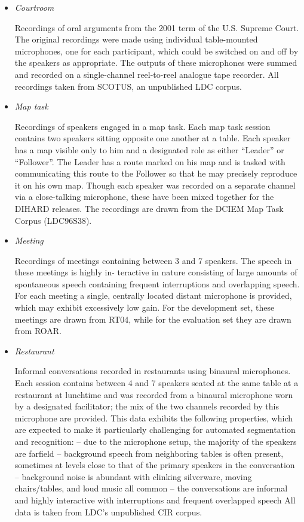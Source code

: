\begin{itemize}
	\item \emph{Courtroom}
	
	Recordings of oral arguments from the 2001 term of the U.S. Supreme Court. The original recordings were made using individual table-mounted microphones, one for each participant, which could be switched on and off by the speakers as appropriate. The outputs of these microphones were summed and recorded on a single-channel reel-to-reel analogue tape recorder. All recordings taken from SCOTUS, an unpublished LDC corpus.
	
	\item \emph{Map task}
	
	Recordings of speakers engaged in a map task. Each map task session contains two speakers sitting opposite one another at a table. Each speaker has a map visible only to him and a designated role as either “Leader” or “Follower”. The Leader has a route marked on his map and is tasked with communicating this route to the Follower so that he may precisely reproduce it on his own map. Though each speaker was recorded on a separate channel via a close-talking microphone, these have been mixed together for the DIHARD releases. The recordings are drawn from the DCIEM Map Task Corpus (LDC96S38).
	
	\item \emph{Meeting}
	
	Recordings of meetings containing between 3 and 7 speakers. The speech in these meetings is highly in- teractive in nature consisting of large amounts of spontaneous speech containing frequent interruptions and overlapping speech. For each meeting a single, centrally located distant microphone is provided, which may exhibit excessively low gain. For the development set, these meetings are drawn from RT04, while for the evaluation set they are drawn from ROAR.
	
	\item \emph{Restaurant}
	
	Informal conversations recorded in restaurants using binaural microphones. Each session contains between 4 and 7 speakers seated at the same table at a restaurant at lunchtime and was recorded from a binaural microphone worn by a designated facilitator; the mix of the two channels recorded by this microphone are provided. This data exhibits the following properties, which are expected to make it particularly challenging for automated segmentation and recognition:
	– due to the microphone setup, the majority of the speakers are farfield
	– background speech from neighboring tables is often present, sometimes at levels close to that of
	the primary speakers in the conversation
	– background noise is abundant with clinking silverware, moving chairs/tables, and loud music all common
	– the conversations are informal and highly interactive with interruptions and frequent overlapped speech
	All data is taken from LDC’s unpublished CIR corpus.
	

\end{itemize}
